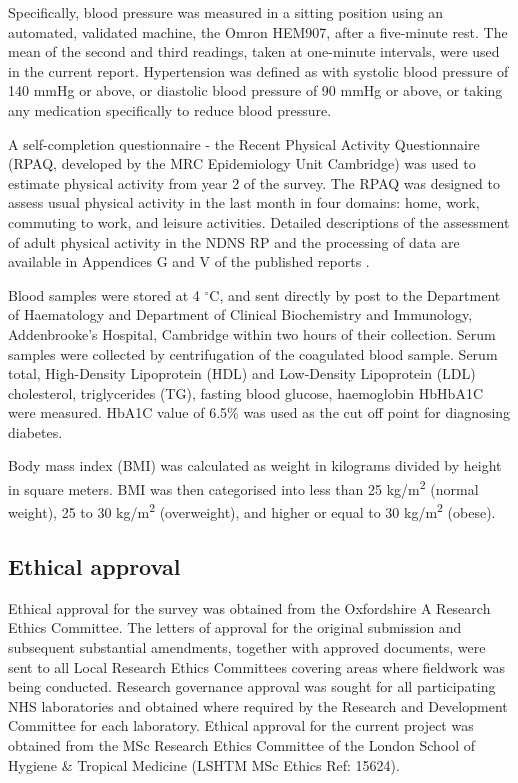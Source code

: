 Specifically, blood pressure was measured in a sitting position using an automated, validated machine, the Omron HEM907, after a five-minute rest. The mean of the second and third readings, taken at one-minute intervals, were used in the current report. Hypertension was defined as with systolic blood pressure of 140 mmHg or above, or diastolic blood pressure of 90 mmHg or above, or taking any medication specifically to reduce blood pressure. 

A self-completion questionnaire - the Recent Physical Activity Questionnaire  \parencite{besson2009estimating} (RPAQ, developed by the MRC Epidemiology Unit Cambridge) was used to estimate physical activity from year 2 of the survey. The RPAQ was designed to assess usual physical activity in the last month in four domains: home, work, commuting to work, and leisure activities. Detailed descriptions of the assessment of adult physical activity in the NDNS RP and the processing of data are available in Appendices G and V of the published reports \parencite{bates2014national,roberts2018national,NDNSofficial}. 

Blood samples were stored at 4 $^\circ$C, and sent directly by post to the Department of Haematology and Department of Clinical Biochemistry and Immunology, Addenbrooke's Hospital, Cambridge within two hours of their collection. Serum samples were collected by centrifugation of the coagulated blood sample. Serum total, High-Density Lipoprotein (HDL) and Low-Density Lipoprotein (LDL) cholesterol, triglycerides (TG), fasting blood glucose, haemoglobin HbHbA1C were measured. HbA1C value of 6.5\% was used as the cut off point for diagnosing diabetes.

Body mass index (BMI) was calculated as weight in kilograms divided by height in square meters. BMI was then categorised into less than 25 kg/m\textsuperscript{2} (normal weight), 25 to 30 kg/m\textsuperscript{2} (overweight), and higher or equal to 30 kg/m\textsuperscript{2} (obese). 

\subsection{Ethical approval}\vspace{-0.3cm}

Ethical approval for the survey was obtained from the Oxfordshire A Research Ethics Committee. The letters of approval for the original submission and subsequent substantial amendments, together with approved documents, were sent to all Local Research Ethics Committees covering areas where fieldwork was being conducted. Research governance approval was sought for all participating NHS laboratories and obtained where required by the Research and Development Committee for each laboratory. Ethical approval for the current project was obtained from the MSc Research Ethics Committee of the London School of Hygiene \& Tropical Medicine (LSHTM MSc Ethics Ref: 15624). 



